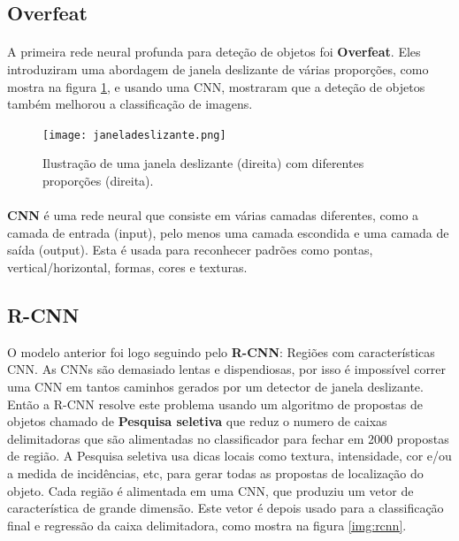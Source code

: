 \subsection{Overfeat}
\label{chap2:subsec:overfeat}

\paragraph{}
A primeira rede neural profunda para deteção de objetos foi \textbf{Overfeat}. Eles introduziram uma abordagem de janela deslizante de várias proporções, como mostra na figura \ref{img:janeladeslizante}, e usando uma \ac{CNN}, mostraram que a deteção de objetos também melhorou a classificação de imagens.

\begin{figure}[h!]
  \label{img:janeladeslizante}
  \texttt{[image: janeladeslizante.png]}
  \caption{Ilustração de uma janela deslizante (direita) com diferentes proporções (direita).}
\end{figure}


\paragraph{}
\textbf{CNN} é uma rede neural que consiste em várias camadas diferentes, como a camada de entrada (input), pelo menos uma camada escondida e uma camada de saída (output). Esta é usada para reconhecer padrões como pontas, vertical/horizontal, formas, cores e texturas.

\subsection{R-CNN}
\label{chap2:subsec:rcnn}

O modelo anterior foi logo seguindo pelo \textbf{\ac{R-CNN}}:  Regiões com características \ac{CNN}. As \ac{CNN}s são demasiado lentas e dispendiosas, por isso é impossível correr uma \ac{CNN} em tantos caminhos gerados por um detector de janela deslizante. Então a \ac{R-CNN} resolve este problema usando um algoritmo de propostas de objetos chamado de \textbf{Pesquisa seletiva} que reduz o numero de caixas delimitadoras que são alimentadas no classificador para fechar em 2000 propostas de região. A Pesquisa seletiva usa dicas locais como textura, intensidade, cor e/ou a medida de incidências, etc, para gerar todas as propostas de localização do objeto. Cada região é alimentada em uma \ac{CNN}, que produziu um vetor de característica de grande dimensão. Este vetor é depois usado para a classificação final e regressão da caixa delimitadora, como mostra na figura \ref{img:rcnn}.


